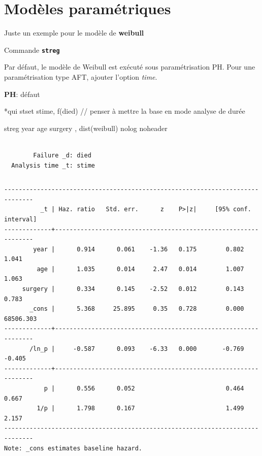 \documentclass[
  12pt,
  letterpaper,
  DIV=11,
  numbers=noendperiod,
  onepage,
  openany]{scrreprt}
\newenvironment{Shaded}{\begin{snugshade}}{\end{snugshade}}
\newcommand{\CommentTok}[1]{\textcolor[rgb]{0.50,0.62,0.50}{#1}}
\newcommand{\FunctionTok}[1]{\textcolor[rgb]{0.94,0.94,0.56}{#1}}
\newcommand{\KeywordTok}[1]{\textcolor[rgb]{0.94,0.87,0.69}{#1}}
\newcommand{\NormalTok}[1]{\textcolor[rgb]{0.80,0.80,0.80}{#1}}
\begin{document}
\hypertarget{moduxe8les-paramuxe9triques-1}{%
\section{Modèles paramétriques}\label{moduxe8les-paramuxe9triques-1}}

Juste un exemple pour le modèle de \textbf{weibull}

Commande \textbf{\texttt{streg}}

Par défaut, le modèle de Weibull est exécuté sous paramétrisation PH.
Pour une paramétrisation type AFT, ajouter l'option \emph{time}.

\textbf{PH}: défaut

\begin{Shaded}
\begin{Highlighting}[]
\NormalTok{*}\KeywordTok{qui} \KeywordTok{stset}\NormalTok{ stime, f(died) }\CommentTok{// penser à mettre la base en mode analyse de durée}

\KeywordTok{streg} \FunctionTok{year}\NormalTok{ age surgery , dist(}\KeywordTok{weibull}\NormalTok{) }\KeywordTok{nolog} \KeywordTok{noheader}
\end{Highlighting}
\end{Shaded}

\begin{verbatim}

        Failure _d: died
  Analysis time _t: stime
\end{verbatim}

\begin{verbatim}
\end{verbatim}

\begin{verbatim}
------------------------------------------------------------------------------
          _t | Haz. ratio   Std. err.      z    P>|z|     [95% conf. interval]
-------------+----------------------------------------------------------------
        year |      0.914      0.061    -1.36   0.175        0.802       1.041
         age |      1.035      0.014     2.47   0.014        1.007       1.063
     surgery |      0.334      0.145    -2.52   0.012        0.143       0.783
       _cons |      5.368     25.895     0.35   0.728        0.000   68506.303
-------------+----------------------------------------------------------------
       /ln_p |     -0.587      0.093    -6.33   0.000       -0.769      -0.405
-------------+----------------------------------------------------------------
           p |      0.556      0.052                         0.464       0.667
         1/p |      1.798      0.167                         1.499       2.157
------------------------------------------------------------------------------
Note: _cons estimates baseline hazard.
\end{verbatim}
\end{document}
